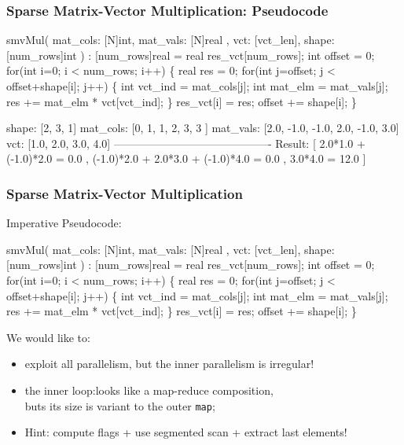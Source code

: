 \documentclass{beamer}
\newcommand{\emp}[1]{\textcolor{DikuRed}{ #1}}
\begin{document}
\begin{frame}[fragile,t]
  \frametitle{Sparse Matrix-Vector Multiplication: Pseudocode}

\begin{colorcode}[fontsize=\scriptsize]
smvMul( mat_cols: [N]int, mat_vals: [N]real
      , vct: [vct_len], shape: [num_rows]int ) : [num_rows]real =
  real res_vct[num_rows];
  int  offset = 0;
  for(int i=0; i < num_rows; i++) \{
    real res = 0;
    \emp{for(int j=offset; j < offset+shape[i]; j++) \{}
        int vct_ind = mat_cols[j];
        int mat_elm = mat_vals[j];
        res += mat_elm * vct[vct_ind];
    \}
    res_vct[i] = res;
    offset += shape[i];
  \}
\end{colorcode}

\bigskip

\begin{colorcode}[fontsize=\scriptsize]
shape:    [2, 3, 1]
mat_cols: [0,    1,    1,   2,    3,   3  ]
mat_vals: [2.0, -1.0, -1.0, 2.0, -1.0, 3.0]
vct:      [1.0,  2.0,  3.0, 4.0]
-------------------------------------------\pause
Result: 
[ 2.0*1.0 + (-1.0)*2.0               = 0.0
, (-1.0)*2.0 + 2.0*3.0 + (-1.0)*4.0  = 0.0
, 3.0*4.0                            = 12.0
]
\end{colorcode}

\end{frame}

\begin{frame}[fragile,t]
  \frametitle{Sparse Matrix-Vector Multiplication}

Imperative Pseudocode:
\begin{colorcode}[fontsize=\scriptsize]
smvMul( mat_cols: [N]int, mat_vals: [N]real
      , vct: [vct_len], shape: [num_rows]int ) : [num_rows]real =
  real res_vct[num_rows];
  int  offset = 0;
  for(int i=0; i < num_rows; i++) \{
    real res = 0;
    \emp{for(int j=offset; j < offset+shape[i]; j++) \{}
        int vct_ind = mat_cols[j];
        int mat_elm = mat_vals[j];
        res += mat_elm * vct[vct_ind];
    \}
    res_vct[i] = res;
    offset += shape[i];
  \}
\end{colorcode}


We would like to:
\begin{itemize}
    \item exploit all parallelism, \emp{but the inner parallelism is irregular!}
    \item the inner loop:\pause looks like a map-reduce composition,\\
            buts its size is variant to the outer {\tt map};
    \item Hint: compute flags + use segmented scan + extract last elements! 
\end{itemize}

\end{frame}
\end{document}
